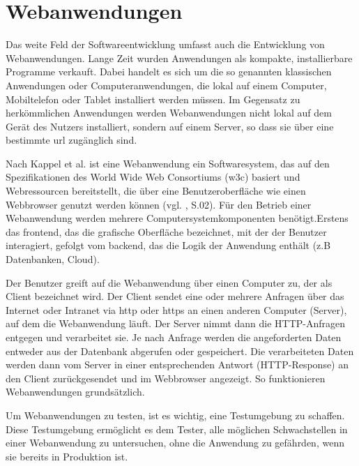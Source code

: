 \section{Webanwendungen}

Das weite Feld der Softwareentwicklung umfasst auch die
Entwicklung von Webanwendungen. Lange Zeit wurden
Anwendungen als kompakte, installierbare Programme
verkauft. Dabei handelt es sich um die so genannten
klassischen Anwendungen oder Computeranwendungen, die
lokal auf einem Computer, Mobiltelefon oder Tablet
installiert werden müssen. Im Gegensatz zu herkömmlichen
Anwendungen werden Webanwendungen nicht lokal auf dem Gerät
des Nutzers installiert, sondern auf einem Server, so dass
sie über eine bestimmte \acs{url} zugänglich sind.

Nach Kappel et al. ist eine Webanwendung ein Softwaresystem,
das auf den Spezifikationen des World Wide Web Consortiums
(\acs{w3c}) basiert und Webressourcen bereitstellt, die über
eine Benutzeroberfläche wie einen Webbrowser genutzt werden
können (vgl. \cite{kappel1}, S.02). Für den Betrieb einer Webanwendung werden mehrere
Computersystemkomponenten benötigt.Erstens das \gls{frontend},
das die grafische Oberfläche bezeichnet, mit der der
Benutzer interagiert, gefolgt vom \gls{backend}, das die
Logik der Anwendung enthält (z.B Datenbanken, Cloud).


Der Benutzer greift auf die Webanwendung über einen Computer
zu, der als Client bezeichnet wird. Der Client sendet eine
oder mehrere Anfragen über das Internet oder Intranet via
\acs{http} oder \acs{https}  an einen anderen Computer (Server),
auf dem die Webanwendung läuft. Der Server nimmt dann die
HTTP-Anfragen entgegen und verarbeitet sie. Je nach Anfrage
werden die angeforderten Daten entweder aus der Datenbank
abgerufen oder gespeichert. Die verarbeiteten Daten werden
dann vom Server in einer entsprechenden Antwort
(HTTP-Response) an den Client zurückgesendet und im
Webbrowser angezeigt. So funktionieren Webanwendungen grundsätzlich.

Um Webanwendungen zu testen, ist es wichtig, eine Testumgebung zu schaffen.
Diese Testumgebung ermöglicht es dem Tester, alle möglichen Schwachstellen in einer Webanwendung zu untersuchen,
ohne die Anwendung zu gefährden, wenn sie bereits in Produktion ist.

